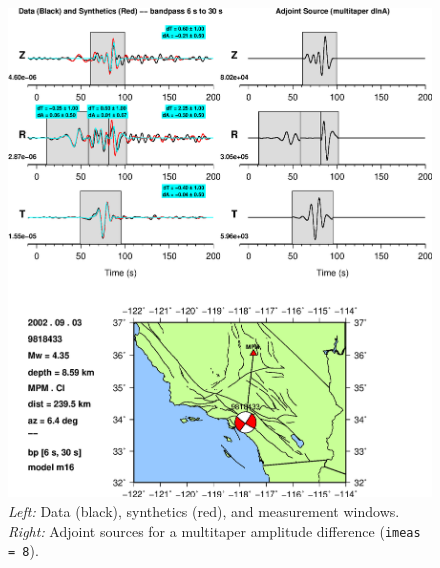 \documentclass[11pt,titlepage,fleqn]{article}
\begin{document}
\begin{figure}
\includegraphics[width=17cm]{9818433_T006_T030_MPM_CI_m16_iker08_win_adj.eps}
\caption[]
{{
{\em Left:} Data (black), synthetics (red), and measurement windows.
{\em Right:} Adjoint sources for a multitaper amplitude difference ({\tt imeas = 8}).
\label{fig:iker08}
}}
\end{figure}

\end{document}
